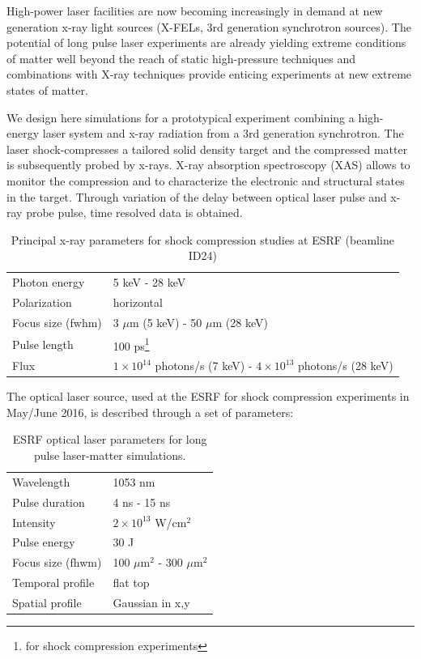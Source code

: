 \documentclass[12pt]{scrartcl}
\begin{document}
High-power  laser facilities are now becoming increasingly in demand at new
generation x-ray light sources (X-FELs, 3rd generation synchrotron sources). The potential of long pulse laser experiments are already yielding extreme conditions of matter well beyond the reach of static high-pressure techniques and combinations with X-ray techniques provide enticing experiments at new extreme states of matter.

We design here simulations for a prototypical experiment combining a high-energy laser system and x-ray radiation
from a 3rd generation synchrotron. The laser shock-compresses a tailored solid density target and the compressed
matter is subsequently probed by x-rays. X-ray absorption spectroscopy (XAS) allows to monitor the compression and
to characterize the electronic and structural states in the target. Through variation of the delay between optical
laser pulse and x-ray probe pulse, time resolved data is obtained.

\begin{table}
  \centering
  \begin{tabular}{ll}
    \hline
    Photon energy & 5 keV - 28 keV \\
    Polarization & horizontal \\
    Focus size (fwhm) & 3 $\mu$m (5 keV) - 50 $\mu$m (28 keV)\\
    Pulse length & 100 ps\footnote{for shock compression experiments}\\
    Flux  & $1\times 10^{14}$ photons/s (7 keV) - $4\times 10^{13}$ photons/s (28 keV) \\
    \hline
  \end{tabular}
  \caption{Principal x-ray parameters for shock compression studies at ESRF
  (beamline ID24)}
  \label{tab:esrf_parameters}
\end{table}

The optical laser source, used at the ESRF for shock compression experiments in May/June 2016,  is described through a set of parameters:
\begin{table}
  \centering
  \begin{tabular}{ll}
    \hline
Wavelength & 1053 nm \\
Pulse duration & 4 ns - 15 ns \\
Intensity & $2\times 10^{13}$ W/cm$^2$ \\
Pulse energy & 30 J \\
Focus size (fhwm) & 100 $\mu\text{m}^{2}$ - 300 $\mu\text{m}^{2}$  \\
Temporal profile  & flat top \\
Spatial profile & Gaussian in x,y \\
    \hline
  \end{tabular}
  \caption{ESRF optical laser parameters for long pulse laser-matter
  simulations.}
  \label{tab:esrf_long_pulse}
\end{table}
\end{document}
